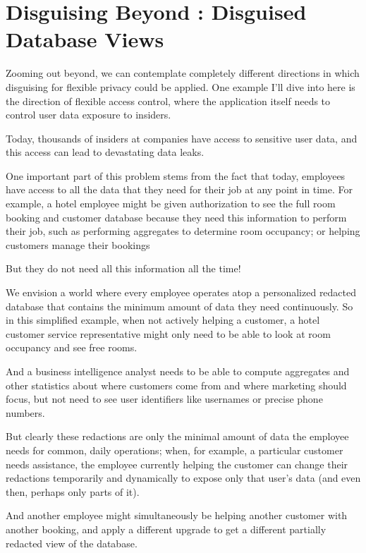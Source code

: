 
\section{Disguising Beyond \sys: Disguised Database Views}
Zooming out beyond, we can contemplate completely different directions in which
disguising for flexible privacy could be applied. One example I’ll dive into
here is the direction of flexible access control, where the application itself
needs to control user data exposure to insiders.

Today, thousands of insiders at companies have access to sensitive user data,
and this access can lead to devastating data leaks.

One important part of this problem stems from the fact that today, employees
have access to all the data that they need for their job at any point in time.
For example, a hotel employee might be given authorization to see the full room
booking and customer database because they need this information to perform
their job, such as performing aggregates to determine room occupancy; or helping
customers manage their bookings

But they do not need all this information all the time!


We envision a world where every employee operates atop a personalized redacted
database that contains the minimum amount of data they need continuously. So in
this simplified example, when not actively helping a customer, a hotel customer
service representative might only need to be able to look at room occupancy and
see free rooms.

And a business intelligence analyst needs to be able to compute aggregates and
other statistics about where customers come from and where marketing should
focus, but not need to see user identifiers like usernames or precise phone
numbers.


But clearly these redactions are only the minimal amount of data the employee
needs for common, daily operations; when, for example, a particular customer
needs assistance, the employee currently helping the customer can change their
redactions temporarily and dynamically to expose only that user’s data (and even
then, perhaps only parts of it).

And another employee might simultaneously be helping another customer with
another booking, and apply a different upgrade to get a different partially
redacted view of the database.

